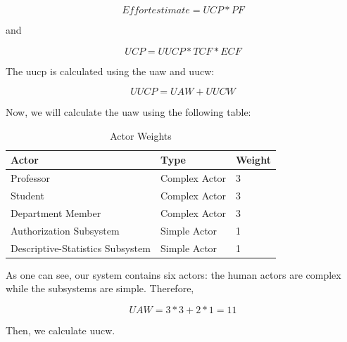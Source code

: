 \documentclass[11pt]{article}
\begin{document}
$$ Effort estimate = UCP * PF $$

and

$$ UCP = UUCP * TCF * ECF $$

The \gls{uucp} is calculated using the \gls{uaw} and \gls{uucw}:

$$ UUCP = UAW + UUCW $$

Now, we will calculate the \gls{uaw} using the following table:

\begin{table}[ht!]
\centering
\caption{Actor Weights}
\begin{tabular}{|l|l|l|}
\hline
Actor                            & Type          & Weight \\ \hline
Professor                        & Complex Actor & 3      \\ \hline
Student                          & Complex Actor & 3      \\ \hline
Department Member                & Complex Actor & 3      \\ \hline
Authorization Subsystem          & Simple Actor  & 1      \\ \hline
Descriptive-Statistics Subsystem & Simple Actor  & 1      \\ \hline
\end{tabular}%
\end{table}

As one can see, our system contains six actors: the human actors are complex while the subsystems are simple. Therefore,

$$ UAW = 3 * 3 + 2 * 1 = 11 $$

\newpage

Then, we calculate \gls{uucw}.
\end{document}
